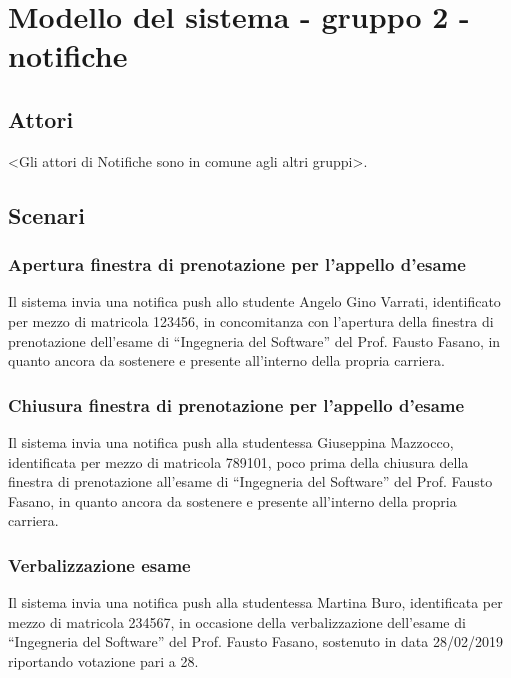 
\chapter{Modello del sistema - gruppo 2 - notifiche}
\label{ref:modSistemaGruppo2-notifiche}

\section{Attori}

<Gli attori di Notifiche sono in comune agli altri gruppi>.

\section{Scenari}

\subsection{Apertura finestra di prenotazione per l’appello d’esame}

Il sistema invia una notifica push allo studente Angelo Gino Varrati, identificato per mezzo di matricola 123456, in concomitanza con l’apertura della finestra di prenotazione dell’esame di “Ingegneria del Software” del Prof. Fausto Fasano, in quanto ancora da sostenere e presente all’interno della propria carriera.

\subsection{Chiusura finestra di prenotazione per l’appello d’esame}

Il sistema invia una notifica push alla studentessa Giuseppina Mazzocco, identificata per mezzo di matricola 789101, poco prima della chiusura della finestra di prenotazione all’esame di “Ingegneria del Software” del Prof. Fausto Fasano, in quanto ancora da sostenere e presente all’interno della propria carriera.

\subsection{Verbalizzazione esame}

Il sistema invia una notifica push alla studentessa Martina Buro, identificata per mezzo di matricola 234567, in occasione della verbalizzazione dell’esame di “Ingegneria del Software” del Prof. Fausto Fasano, sostenuto in data 28/02/2019 riportando votazione pari a 28.

